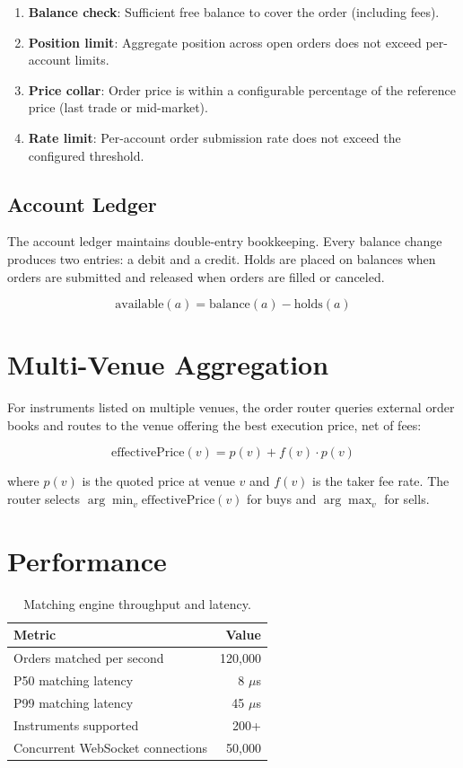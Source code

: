 \documentclass[11pt,a4paper]{article}
\begin{document}
\begin{enumerate}
    \item \textbf{Balance check}: Sufficient free balance to cover the order (including fees).
    \item \textbf{Position limit}: Aggregate position across open orders does not exceed per-account limits.
    \item \textbf{Price collar}: Order price is within a configurable percentage of the reference price (last trade or mid-market).
    \item \textbf{Rate limit}: Per-account order submission rate does not exceed the configured threshold.
\end{enumerate}

\subsection{Account Ledger}

The account ledger maintains double-entry bookkeeping. Every balance change produces two entries: a debit and a credit. Holds are placed on balances when orders are submitted and released when orders are filled or canceled.

\begin{equation}
    \text{available}(a) = \text{balance}(a) - \text{holds}(a)
\end{equation}

\section{Multi-Venue Aggregation}

For instruments listed on multiple venues, the order router queries external order books and routes to the venue offering the best execution price, net of fees:

\begin{equation}
    \text{effectivePrice}(v) = p(v) + f(v) \cdot p(v)
\end{equation}

where $p(v)$ is the quoted price at venue $v$ and $f(v)$ is the taker fee rate. The router selects $\arg\min_v \text{effectivePrice}(v)$ for buys and $\arg\max_v$ for sells.

\section{Performance}

\begin{table}[h]
\centering
\caption{Matching engine throughput and latency.}
\begin{tabular}{lr}
\toprule
\textbf{Metric} & \textbf{Value} \\
\midrule
Orders matched per second & 120{,}000 \\
P50 matching latency & 8 $\mu$s \\
P99 matching latency & 45 $\mu$s \\
Instruments supported & 200+ \\
Concurrent WebSocket connections & 50{,}000 \\
\bottomrule
\end{tabular}
\end{table}
\end{document}
